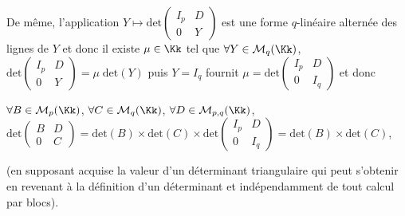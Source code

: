 {{De même, l'application $Y\mapsto\text{det}\left(
 \begin{array}{cc}
 I_p&D\\
 0&Y
 \end{array}
 \right)$ est une forme $q$-linéaire alternée des lignes de $Y$ et donc il existe $\mu\in\Kk$ tel que $\forall Y\in\mathcal{M}_q(\Kk)$, $\text{det}\left(
 \begin{array}{cc}
 I_p&D\\
 0&Y
 \end{array}
 \right)=\mu\;\text{det}(Y)$ puis $Y=I_q$ fournit $\mu=\text{det}\left(
 \begin{array}{cc}
 I_p&D\\
 0&I_q
 \end{array}
 \right)$ et donc 
 
 \begin{center}
 $\forall B\in\mathcal{M}_p(\Kk)$, $\forall C\in\mathcal{M}_q(\Kk)$, $\forall D\in\mathcal{M}_{p,q}(\Kk)$, $\text{det}\left(
 \begin{array}{cc}
 B&D\\
 0&C
 \end{array}
 \right)=\text{det}(B)\times\text{det}(C)\times\text{det}\left(
 \begin{array}{cc}
 I_p&D\\
 0&I_q
 \end{array}
 \right)=\text{det}(B)\times\text{det}(C)$,
 \end{center}
 

(en supposant acquise la valeur d'un déterminant triangulaire qui peut s'obtenir en revenant à la définition d'un déterminant et indépendamment de tout calcul par blocs).

 \begin{center}
 \end{center}
}
}
